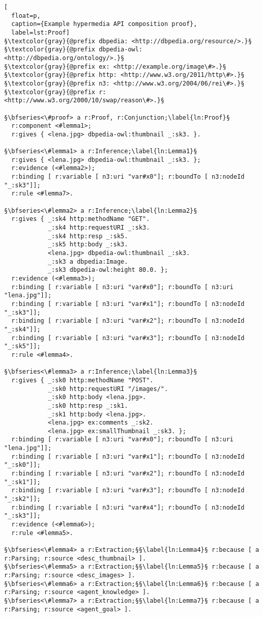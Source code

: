 \begin{lstlisting}[
  float=p,
  caption={Example hypermedia API composition proof},
  label=lst:Proof]
§\textcolor{gray}{@prefix dbpedia: <http://dbpedia.org/resource/>.}§
§\textcolor{gray}{@prefix dbpedia-owl: <http://dbpedia.org/ontology/>.}§
§\textcolor{gray}{@prefix ex: <http://example.org/image\#>.}§
§\textcolor{gray}{@prefix http: <http://www.w3.org/2011/http\#>.}§
§\textcolor{gray}{@prefix n3: <http://www.w3.org/2004/06/rei\#>.}§
§\textcolor{gray}{@prefix r: <http://www.w3.org/2000/10/swap/reason\#>.}§

§\bfseries<\#proof> a r:Proof, r:Conjunction;\label{ln:Proof}§
  r:component <#lemma1>;
  r:gives { <lena.jpg> dbpedia-owl:thumbnail _:sk3. }.

§\bfseries<\#lemma1> a r:Inference;\label{ln:Lemma1}§
  r:gives { <lena.jpg> dbpedia-owl:thumbnail _:sk3. };
  r:evidence (<#lemma2>);
  r:binding [ r:variable [ n3:uri "var#x0"]; r:boundTo [ n3:nodeId "_:sk3"]];
  r:rule <#lemma7>.
  
§\bfseries<\#lemma2> a r:Inference;\label{ln:Lemma2}§
  r:gives { _:sk4 http:methodName "GET".
            _:sk4 http:requestURI _:sk3.
            _:sk4 http:resp _:sk5.
            _:sk5 http:body _:sk3.
            <lena.jpg> dbpedia-owl:thumbnail _:sk3.
            _:sk3 a dbpedia:Image.
            _:sk3 dbpedia-owl:height 80.0. };
  r:evidence (<#lemma3>);
  r:binding [ r:variable [ n3:uri "var#x0"]; r:boundTo [ n3:uri "lena.jpg"]];
  r:binding [ r:variable [ n3:uri "var#x1"]; r:boundTo [ n3:nodeId "_:sk3"]];
  r:binding [ r:variable [ n3:uri "var#x2"]; r:boundTo [ n3:nodeId "_:sk4"]];
  r:binding [ r:variable [ n3:uri "var#x3"]; r:boundTo [ n3:nodeId "_:sk5"]];
  r:rule <#lemma4>.
  
§\bfseries<\#lemma3> a r:Inference;\label{ln:Lemma3}§
  r:gives { _:sk0 http:methodName "POST".
            _:sk0 http:requestURI "/images/".
            _:sk0 http:body <lena.jpg>.
            _:sk0 http:resp _:sk1.
            _:sk1 http:body <lena.jpg>.
            <lena.jpg> ex:comments _:sk2.
            <lena.jpg> ex:smallThumbnail _:sk3. };
  r:binding [ r:variable [ n3:uri "var#x0"]; r:boundTo [ n3:uri "lena.jpg"]];
  r:binding [ r:variable [ n3:uri "var#x1"]; r:boundTo [ n3:nodeId "_:sk0"]];
  r:binding [ r:variable [ n3:uri "var#x2"]; r:boundTo [ n3:nodeId "_:sk1"]];
  r:binding [ r:variable [ n3:uri "var#x3"]; r:boundTo [ n3:nodeId "_:sk2"]];
  r:binding [ r:variable [ n3:uri "var#x4"]; r:boundTo [ n3:nodeId "_:sk3"]];   
  r:evidence (<#lemma6>);
  r:rule <#lemma5>.
  
§\bfseries<\#lemma4> a r:Extraction;§§\label{ln:Lemma4}§ r:because [ a r:Parsing; r:source <desc_thumbnail> ].
§\bfseries<\#lemma5> a r:Extraction;§§\label{ln:Lemma5}§ r:because [ a r:Parsing; r:source <desc_images> ].
§\bfseries<\#lemma6> a r:Extraction;§§\label{ln:Lemma6}§ r:because [ a r:Parsing; r:source <agent_knowledge> ].
§\bfseries<\#lemma7> a r:Extraction;§§\label{ln:Lemma7}§ r:because [ a r:Parsing; r:source <agent_goal> ].
\end{lstlisting}

